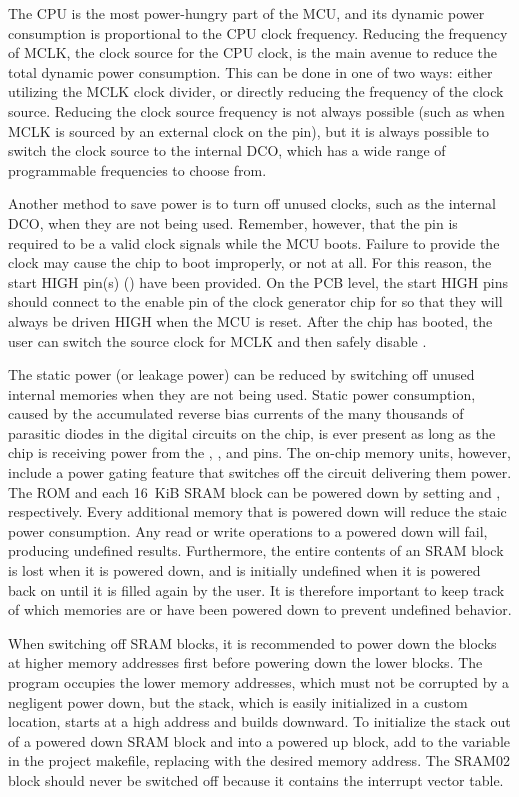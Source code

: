 The CPU is the most power-hungry part of the MCU, and its dynamic power consumption is proportional to the CPU clock frequency. Reducing the frequency of MCLK, the clock source for the CPU clock, is the main avenue to reduce the total dynamic power consumption. This can be done in one of two ways: either utilizing the MCLK clock divider, or directly reducing the frequency of the clock source. Reducing the clock source frequency is not always possible (such as when MCLK is sourced by an external clock on the  pin), but it is always possible to switch the clock source to the internal DCO, which has a wide range of programmable frequencies to choose from.

Another method to save power is to turn off unused clocks, such as the internal DCO, when they are not being used. Remember, however, that the  pin is required to be a valid clock signals while the MCU boots. Failure to provide the clock may cause the chip to boot improperly, or not at all. For this reason, the start HIGH pin(s) () have been provided. On the PCB level, the start HIGH pins should connect to the enable pin of the clock generator chip for  so that they will always be driven HIGH when the MCU is reset. After the chip has booted, the user can switch the source clock for MCLK and then safely disable .

The static power (or leakage power) can be reduced by switching off unused internal memories when they are not being used. Static power consumption, caused by the accumulated reverse bias currents of the many thousands of parasitic diodes in the digital circuits on the chip, is ever present as long as the chip is receiving power from the , , and  pins. The on-chip memory units, however, include a power gating feature that switches off the circuit delivering them power. The ROM and each 16~KiB SRAM block can be powered down by setting  and , respectively. Every additional memory that is powered down will reduce the staic power consumption. Any read or write operations to a powered down will fail, producing undefined results. Furthermore, the entire contents of an SRAM block is lost when it is powered down, and is initially undefined when it is powered back on until it is filled again by the user. It is therefore important to keep track of which memories are or have been powered down to prevent undefined behavior.

When switching off SRAM blocks, it is recommended to power down the blocks at higher memory addresses first before powering down the lower blocks. The program occupies the lower memory addresses, which must not be corrupted by a negligent power down, but the stack, which is easily initialized in a custom location, starts at a high address and builds downward. To initialize the stack out of a powered down SRAM block and into a powered up block, add  to the  variable in the project makefile, replacing  with the desired memory address. The SRAM02 block should never be switched off because it contains the interrupt vector table.

